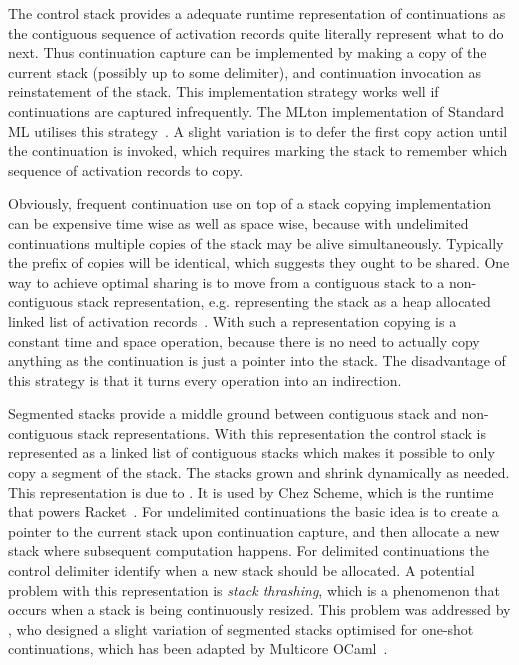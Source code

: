 \documentclass[12pt,phd,lfcs,twoside,openright,logo,leftchapter,normalheadings]{infthesis}
\theoremstyle{plain}
\theoremstyle{definition}
\begin{document}
%
The control stack provides a adequate runtime representation of
continuations as the contiguous sequence of activation records quite
literally represent what to do next.
%
Thus continuation capture can be implemented by making a copy of the
current stack (possibly up to some delimiter), and continuation
invocation as reinstatement of the stack. This implementation strategy
works well if continuations are captured infrequently. The MLton
implementation of Standard ML utilises this strategy~\cite{Fluet20}.
A slight variation is to defer the first copy action until the
continuation is invoked, which requires marking the stack to remember
which sequence of activation records to copy.

Obviously, frequent continuation use on top of a stack copying
implementation can be expensive time wise as well as space wise,
because with undelimited continuations multiple copies of the stack
may be alive simultaneously.
%
Typically the prefix of copies will be identical, which suggests they
ought to be shared. One way to achieve optimal sharing is to move from
a contiguous stack to a non-contiguous stack representation,
e.g. representing the stack as a heap allocated linked list of
activation records~\cite{Danvy87}. With such a representation copying
is a constant time and space operation, because there is no need to
actually copy anything as the continuation is just a pointer into the
stack.
%
The disadvantage of this strategy is that it turns every operation
into an indirection.

Segmented stacks provide a middle ground between contiguous stack and
non-contiguous stack representations. With this representation the
control stack is represented as a linked list of contiguous stacks
which makes it possible to only copy a segment of the stack. The
stacks grown and shrink dynamically as needed. This representation is
due to \citet{HiebDB90}. It is used by Chez Scheme, which is the
runtime that powers Racket~\cite{FlattD20}.
%
For undelimited continuations the basic idea is to create a pointer to
the current stack upon continuation capture, and then allocate a new
stack where subsequent computation happens.
%
For delimited continuations the control delimiter identify when a new
stack should be allocated.
%
A potential problem with this representation is \emph{stack
  thrashing}, which is a phenomenon that occurs when a stack is being
continuously resized.
%
This problem was addressed by \citet{BruggemanWD96}, who designed a
slight variation of segmented stacks optimised for one-shot
continuations, which has been adapted by Multicore
OCaml~\cite{DolanEHMSW17}.
\end{document}
